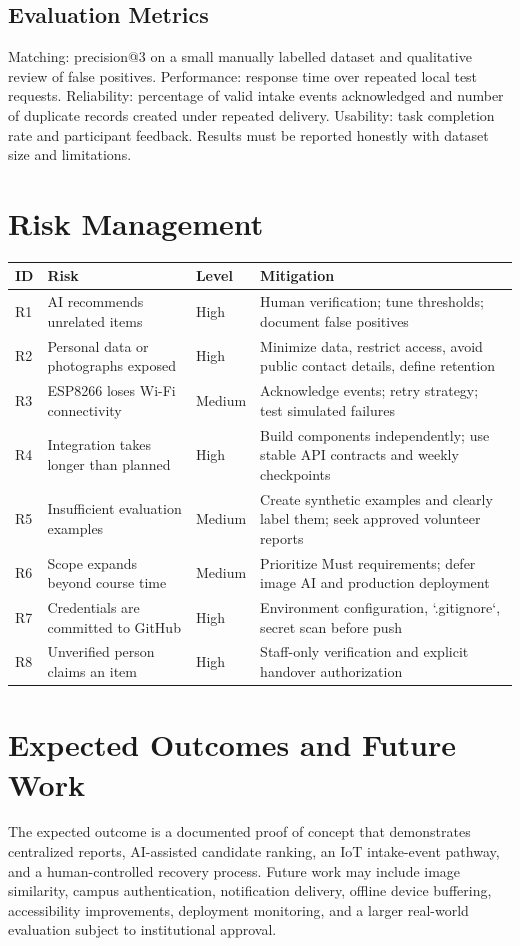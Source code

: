 \documentclass[12pt,a4paper]{report}
\begin{document}
\section{Evaluation Metrics}
Matching: precision@3 on a small manually labelled dataset and qualitative review of false positives. Performance: response time over repeated local test requests. Reliability: percentage of valid intake events acknowledged and number of duplicate records created under repeated delivery. Usability: task completion rate and participant feedback. Results must be reported honestly with dataset size and limitations.

\chapter{Risk Management}
\begin{longtable}{p{}p{}p{}p{}}
\toprule
ID & Risk & Level & Mitigation\\\midrule
R1 & AI recommends unrelated items & High & Human verification; tune thresholds; document false positives\\
R2 & Personal data or photographs exposed & High & Minimize data, restrict access, avoid public contact details, define retention\\
R3 & ESP8266 loses Wi-Fi connectivity & Medium & Acknowledge events; retry strategy; test simulated failures\\
R4 & Integration takes longer than planned & High & Build components independently; use stable API contracts and weekly checkpoints\\
R5 & Insufficient evaluation examples & Medium & Create synthetic examples and clearly label them; seek approved volunteer reports\\
R6 & Scope expands beyond course time & Medium & Prioritize Must requirements; defer image AI and production deployment\\
R7 & Credentials are committed to GitHub & High & Environment configuration, `.gitignore`, secret scan before push\\
R8 & Unverified person claims an item & High & Staff-only verification and explicit handover authorization\\
\bottomrule
\end{longtable}

\chapter{Expected Outcomes and Future Work}
The expected outcome is a documented proof of concept that demonstrates centralized reports, AI-assisted candidate ranking, an IoT intake-event pathway, and a human-controlled recovery process. Future work may include image similarity, campus authentication, notification delivery, offline device buffering, accessibility improvements, deployment monitoring, and a larger real-world evaluation subject to institutional approval.
\end{document}
